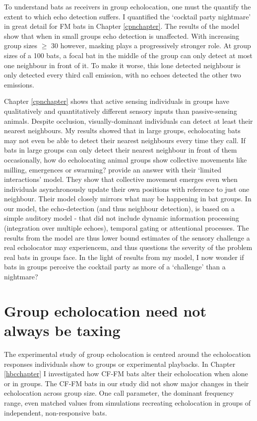 \documentclass[
]{book}
\begin{document}
To understand bats as receivers in group echolocation, one must the quantify the extent to which echo detection suffers. I quantified the `cocktail party nightmare' in great detail for FM bats in Chapter \ref{cpnchapter}. The results of the model show that when in small groups echo detection is unaffected. With increasing group sizes \(\geq\) 30 however, masking plays a progressively stronger role. At group sizes of a 100 bats, a focal bat in the middle of the group can only detect at most one neighbour in front of it. To make it worse, this lone detected neighbour is only detected every third call emission, with no echoes detected the other two emissions.

Chapter \ref{cpnchapter} shows that active sensing individuals in groups have qualitatively and quantitatively different sensory inputs than passive-sensing animals. Despite occlusion, visually-dominant individuals can detect at least their nearest neighbours. My results showed that in large groups, echolocating bats may not even be able to detect their nearest neighbours every time they call.
If bats in large groups can only detect their nearest neighbour in front of them occasionally, how do echolocating animal groups show collective movements like milling, emergences or swarming? \citet{bode2011a} provide an answer with their `limited interactions' model. They show that collective movement emerges even when individuals asynchronously update their own positions with reference to just one neighbour. Their model closely mirrors what may be happening in bat groups. In our model, the echo-detection (and thus neighbour detection), is based on a simple auditory model - that did not include dynamic information processing (integration over multiple echoes), temporal gating or attentional processes. The results from the model are thus lower bound estimates of the sensory challenge a real echolocator may experiencem, and thus questions the severity of the problem real bats in groups face. In the light of results from my model, I now wonder if bats in groups perceive the cocktail party as more of a `challenge' than a nightmare?

\hypertarget{group-echolocation-need-not-always-be-taxing}{%
\section{Group echolocation need not always be taxing}\label{group-echolocation-need-not-always-be-taxing}}

The experimental study of group echolocation is centred around the echolocation responses individuals show to groups or experimental playbacks. In Chapter \ref{hbcchapter} I investigated how CF-FM bats alter their echolocation when alone or in groups. The CF-FM bats in our study did not show major changes in their echolocation across group size. One call parameter, the dominant frequency range, even matched values from simulations recreating echolocation in groups of independent, non-responsive bats.
\end{document}
